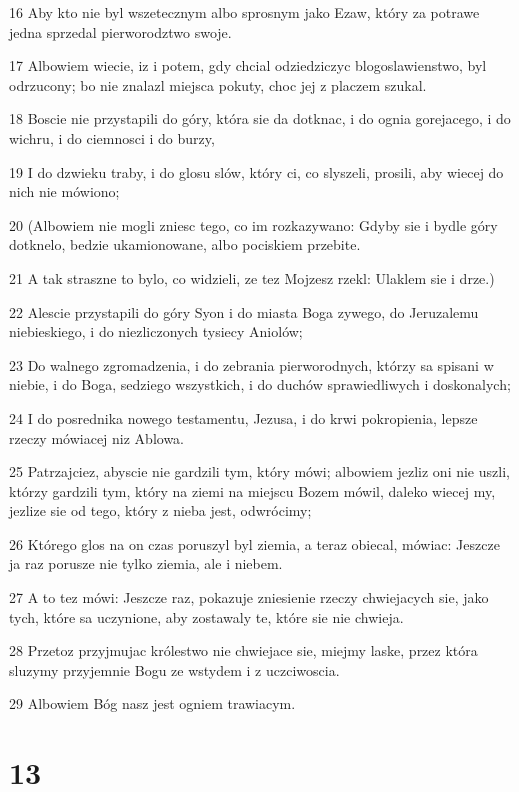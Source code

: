 \par 16 Aby kto nie byl wszetecznym albo sprosnym jako Ezaw, który za potrawe jedna sprzedal pierworodztwo swoje.
\par 17 Albowiem wiecie, iz i potem, gdy chcial odziedziczyc blogoslawienstwo, byl odrzucony; bo nie znalazl miejsca pokuty, choc jej z placzem szukal.
\par 18 Boscie nie przystapili do góry, która sie da dotknac, i do ognia gorejacego, i do wichru, i do ciemnosci i do burzy,
\par 19 I do dzwieku traby, i do glosu slów, który ci, co slyszeli, prosili, aby wiecej do nich nie mówiono;
\par 20 (Albowiem nie mogli zniesc tego, co im rozkazywano: Gdyby sie i bydle góry dotknelo, bedzie ukamionowane, albo pociskiem przebite.
\par 21 A tak straszne to bylo, co widzieli, ze tez Mojzesz rzekl: Ulaklem sie i drze.)
\par 22 Alescie przystapili do góry Syon i do miasta Boga zywego, do Jeruzalemu niebieskiego, i do niezliczonych tysiecy Aniolów;
\par 23 Do walnego zgromadzenia, i do zebrania pierworodnych, którzy sa spisani w niebie, i do Boga, sedziego wszystkich, i do duchów sprawiedliwych i doskonalych;
\par 24 I do posrednika nowego testamentu, Jezusa, i do krwi pokropienia, lepsze rzeczy mówiacej niz Ablowa.
\par 25 Patrzajciez, abyscie nie gardzili tym, który mówi; albowiem jezliz oni nie uszli, którzy gardzili tym, który na ziemi na miejscu Bozem mówil, daleko wiecej my, jezlize sie od tego, który z nieba jest, odwrócimy;
\par 26 Którego glos na on czas poruszyl byl ziemia, a teraz obiecal, mówiac: Jeszcze ja raz porusze nie tylko ziemia, ale i niebem.
\par 27 A to tez mówi: Jeszcze raz, pokazuje zniesienie rzeczy chwiejacych sie, jako tych, które sa uczynione, aby zostawaly te, które sie nie chwieja.
\par 28 Przetoz przyjmujac królestwo nie chwiejace sie, miejmy laske, przez która sluzymy przyjemnie Bogu ze wstydem i z uczciwoscia.
\par 29 Albowiem Bóg nasz jest ogniem trawiacym.

\chapter{13}

